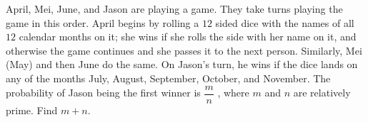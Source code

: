April, Mei, June, and Jason are playing a game. They take turns playing the game in this order. April begins by rolling a $12$ sided dice with the names of all $12$ calendar months on it; she wins if she rolls the side with her name on it, and otherwise the game continues and she passes it to the next person. Similarly, Mei (May) and then June do the same. On Jason's turn, he wins if the dice lands on any of the months July, August, September, October, and November. The probability of Jason being the first winner is $\dfrac{m}{n}$ , where $m$ and $n$ are relatively prime. Find $m + n$.
